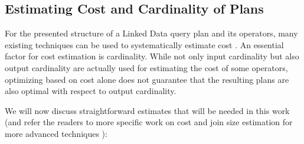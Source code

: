 \subsection{Estimating Cost and Cardinality of Plans}
\label{sec:estimation}
For the presented structure of a Linked Data query plan and its operators, many existing techniques can be used to systematically estimate cost \cite{stocker_sparql_2008,neumann_scalable_2009,huang_selectivity_2010}. An essential factor for cost estimation is cardinality. While not only input cardinality but also output cardinality are actually used for estimating the cost of some operators, optimizing based on cost alone does not guarantee that the resulting plans are also optimal with respect to output cardinality. 

We will now discuss straightforward estimates that will be needed in this work (and refer the readers to more specific work on cost and join size estimation for more advanced techniques \cite{stocker_sparql_2008,neumann_scalable_2009,huang_selectivity_2010}):

